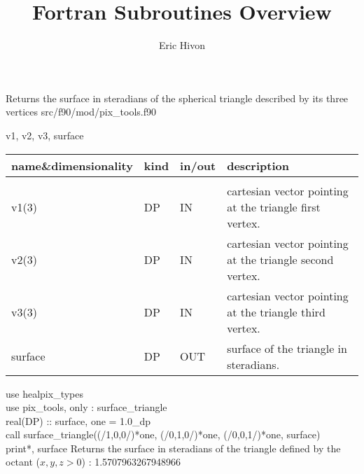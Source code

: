 
\sloppy


\title{\healpix Fortran Subroutines Overview}
 \section[surface\_triangle]{ }
\label{sub:surface_triangle}
\author{Eric Hivon}

\begin{facility}
{Returns the surface in steradians of the spherical triangle described by its
three vertices} 
{src/f90/mod/pix\_tools.f90}
\end{facility}

\begin{f90format}
{v1, v2, v3, surface}
\end{f90format}

\begin{arguments}
{
\begin{tabular}{p{0.25\hsize} p{0.05\hsize} p{0.1\hsize} p{0.5\hsize}} \hline 
\textbf{name\&dimensionality} & \textbf{kind} & \textbf{in/out} & \textbf{description} \\ \hline
                   &   &   &                           \\ %
v1(3) & DP & IN & cartesian vector pointing at the triangle first vertex. \\
v2(3) & DP & IN & cartesian vector pointing at the triangle second vertex. \\
v3(3) & DP & IN & cartesian vector pointing at the triangle third vertex. \\
surface & DP & OUT & surface of the triangle in steradians.
\end{tabular}
}
\end{arguments}

\begin{example}
{
use healpix\_types \\
use pix\_tools,    only : surface\_triangle \\
real(DP) :: surface, one = 1.0\_dp \\
call surface\_triangle((/1,0,0/)*one, (/0,1,0/)*one, (/0,0,1/)*one, surface)  \\
print*, surface
}
{
Returns the surface in steradians of the triangle defined by the octant ($x,y,z>0$) : 1.5707963267948966
}
\end{example}

